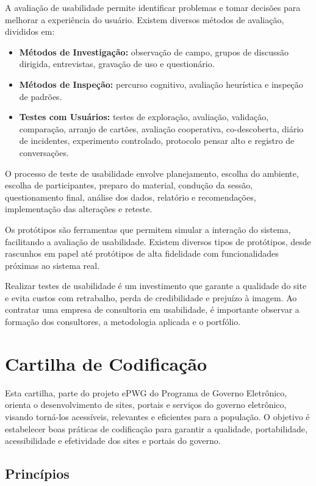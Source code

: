 \documentclass[
  12pt,
  openright,
  twoside,
  a4paper,
  english,
  french,
  spanish,
  brazil
]{abntex2}
\begin{document}
A avaliação de usabilidade permite identificar problemas e tomar decisões para
melhorar a experiência do usuário. Existem diversos métodos de avaliação,
divididos em:

\begin{itemize}
  \item
    \textbf{Métodos de Investigação:} observação de campo, grupos de discussão
    dirigida, entrevistas, gravação de uso e questionário.
  \item
    \textbf{Métodos de Inspeção:} percurso cognitivo, avaliação heurística e
    inspeção de padrões.
  \item
    \textbf{Testes com Usuários:} testes de exploração, avaliação, validação,
    comparação, arranjo de cartões, avaliação cooperativa, co-descoberta, diário
    de incidentes, experimento controlado, protocolo pensar alto e registro de
    conversações.
\end{itemize}

O processo de teste de usabilidade envolve planejamento, escolha do ambiente,
escolha de participantes, preparo do material, condução da sessão,
questionamento final, análise dos dados, relatório e recomendações,
implementação das alterações e reteste.

Os protótipos são ferramentas que permitem simular a interação do sistema,
facilitando a avaliação de usabilidade. Existem diversos tipos de protótipos,
desde rascunhos em papel até protótipos de alta fidelidade com funcionalidades
próximas ao sistema real.

Realizar testes de usabilidade é um investimento que garante a qualidade do site
e evita custos com retrabalho, perda de credibilidade e prejuízo à imagem. Ao
contratar uma empresa de consultoria em usabilidade, é importante observar a
formação dos consultores, a metodologia aplicada e o portfólio.

\section{Cartilha de Codificação}

Esta cartilha, parte do projeto ePWG do Programa de Governo Eletrônico, orienta
o desenvolvimento de sites, portais e serviços do governo eletrônico, visando
torná-los acessíveis, relevantes e eficientes para a população. O objetivo é
estabelecer boas práticas de codificação para garantir a qualidade,
portabilidade, acessibilidade e efetividade dos sites e portais do governo.

\subsection{Princípios}
\end{document}
